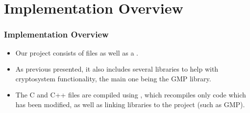 \section{Implementation Overview}



\begin{frame}
\frametitle{Implementation Overview}
\begin{itemize}
\item Our project consists of  files as well
  as a .
\item As previous presented, it also includes several
  libraries to help with cryptosystem functionality, the
  main one being the GMP library.
\item The C and C++ files are compiled using ,
  which recompiles only code which has been modified, as
  well as linking libraries to the project (such as GMP).
\end{itemize}
\end{frame}
